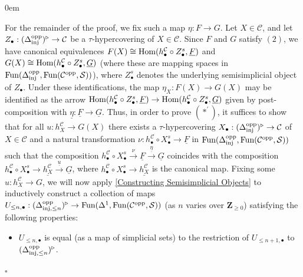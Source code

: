 \documentclass[10pt]{article}
\newcommand{\mS}{\mathcal S}
\newcommand{\C}{\mathcal C}
\newcommand{\ZZ}{\mathbb{Z}}
\def\ZZ{{\mathbf Z}}
\renewcommand{\qed}{\hfill$\square$}
\renewenvironment{proof}{\begin{addmargin}[1em]{0em}\begin{newproof}}{\end{newproof}\end{addmargin}\qed}
\theoremstyle{witharg}
\theoremstyle{witharg}
\theoremstyle{witharg2}
\begin{document}
\begin{proof}
   \noindent For the remainder of the proof, we fix such a map $\eta:F\rightarrow G$. Let $X\in \C$, and let $Z_\bullet:(\Delta^{\textnormal{opp}}_{\textnormal{inj}})^\triangleright\rightarrow \C$ be a $\tau$-hypercovering of $X\in \C$. Since $F$ and $G$ satisfy $(2)$, we have canonical equivalences $F(X)\cong \textnormal{Hom}(h^\C_\bullet\circ Z^s_\bullet,\underline{F})$ and $G(X)\cong \textnormal{Hom}(h^\C_\bullet\circ Z^s_\bullet,\underline{G})$ (where these are mapping spaces in $\textnormal{Fun}(\Delta_{\textnormal{inj}}^{\textnormal{opp}},\textnormal{Fun}(\C^{\textnormal{opp}},\mS))$), where $Z^s_\bullet$ denotes the underlying semisimplicial object of $Z_\bullet$. Under these identifications, the map $\eta_X:F(X)\rightarrow G(X)$ may be identified as the arrow $\textnormal{Hom}(h^\C_\bullet\circ Z^s_\bullet,\underline{F})\rightarrow \textnormal{Hom}(h^\C_\bullet\circ Z^s_\bullet,\underline{G})$ given by post-composition with $\underline{\eta}:\underline{F}\rightarrow \underline{G}$. Thus, in order to prove $(*^\prime)$, it suffices to show that for all $u:h^\C_X\rightarrow G(X)$ there exists a $\tau$-hypercovering $X_\bullet:(\Delta^{\textnormal{opp}}_{\textnormal{inj}})^\triangleright\rightarrow \C$ of $X\in \C$ and a natural transformation $\nu: h^\C_\bullet\circ X^s_\bullet\rightarrow \underline{F}$ in $\textnormal{Fun}(\Delta_{\textnormal{inj}}^{\textnormal{opp}},\textnormal{Fun}(\C^{\textnormal{opp}},\mS))$ such that the composition $h^\C_\bullet\circ X^s_\bullet\xrightarrow{\nu} \underline{F}\xrightarrow{\underline{\eta}}\underline{G}$ coincides with the composition $h^\C_\bullet\circ X^s_\bullet\rightarrow \underline{h^\C_X}\xrightarrow{\underline{u}}\underline{G}$, where $h^\C_\bullet\circ X^s_\bullet\rightarrow \underline{h^\C_X}$ is the canonical map. Fixing some $u:h^\C_X\rightarrow G$, we will now apply \ref{Constructing Semisimplicial Objects} to inductively construct a collection of maps $U_{\leq n,\bullet}:(\Delta^{\textnormal{opp}}_{\textnormal{inj},\leq n})^\triangleright\rightarrow \textnormal{Fun}(\Delta^1,\textnormal{Fun}(\C^{\textnormal{opp}},\mS))$ (as $n$ varies over $\ZZ_{\geq 0}$) satisfying the following properties: 
   

   \begin{itemize}
   
       \item [\textnormal{(i)}] $U_{\leq n,\bullet}$ is equal (as a map of simplicial sets) to the restriction of $U_{\leq n+1,\bullet}$ to $(\Delta^{\textnormal{opp}}_{\textnormal{inj},\leq n})^\triangleright$. 


\end{itemize}
\end{proof}
\end{document}
